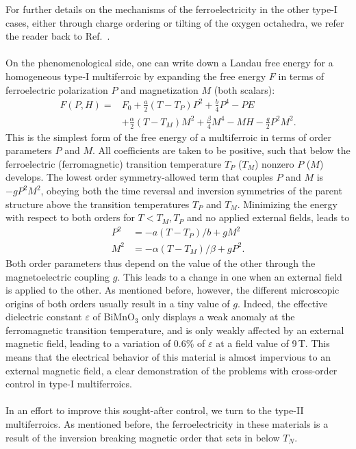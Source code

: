 For further details on the mechanisms of the ferroelectricity in the other type-I cases, either through charge ordering or tilting of the oxygen octahedra, we refer the reader back to Ref.~\cite{Khomskii2009}.
\\\\
On the phenomenological side, one can write down a Landau free energy for a homogeneous type-I multiferroic by expanding the free energy $F$ in terms of ferroelectric polarization $P$ and magnetization $M$ (both scalars):
\begin{align}
	F(P, H) =& F_0 + \frac{a}{2} (T-T_P) P^2 + \frac{b}{4} P^4 - P E \\
	&+\frac{\alpha}{2} (T-T_M)M^2 + \frac{\beta}{4} M^4 - MH - \frac{g}{2}P^2 M^2.
\end{align}
This is the simplest form of the free energy of a multiferroic in terms of order parameters $P$ and $M$.
All coefficients are taken to be positive, such that below the ferroelectric (ferromagnetic) transition temperature $T_P$ ($T_M$) nonzero $P$ ($M$) develops.
The lowest order symmetry-allowed term that couples $P$ and $M$ is $-gP^2M^2$, obeying both the time reversal and inversion symmetries of the parent structure above the transition temperatures $T_P$ and $T_M$.
Minimizing the energy with respect to both orders for $T<T_M,T_P$ and no applied external fields, leads to
\begin{align}
	P^2 &= - a(T-T_P)/b + gM^2\\
	M^2 &= - \alpha(T-T_M)/\beta + gP^2.
\end{align}
Both order parameters thus depend on the value of the other through the magnetoelectric coupling $g$. This leads to a change in one when an external field is applied to the other.
As mentioned before, however, the different microscopic origins of both orders usually result in a tiny value of $g$.
Indeed, the effective dielectric constant $\varepsilon$ of BiMnO$_3$ only displays a weak anomaly at the ferromagnetic transition temperature, and is only weakly affected by an external magnetic field, leading to a variation of 0.6\% of $\varepsilon$ at a field value of 9\,T.
This means that the electrical behavior of this material is almost impervious to an external magnetic field, a clear demonstration of the problems with cross-order control in type-I multiferroics.
\\\\
In an effort to improve this sought-after control, we turn to the type-II multiferroics.
As mentioned before, the ferroelectricity in these materials is a result of the inversion breaking magnetic order that sets in below $T_N$.
